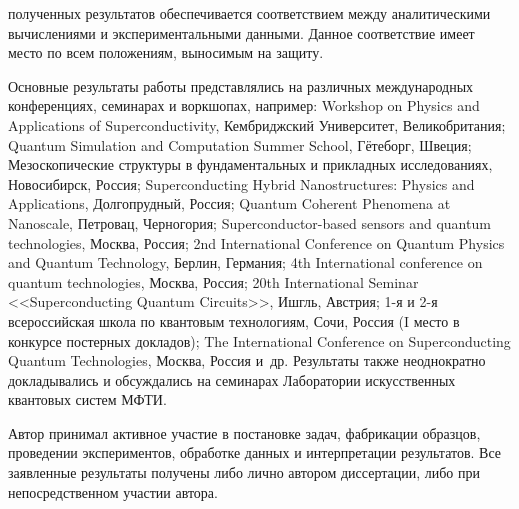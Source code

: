 {\reliability} полученных результатов обеспечивается соответствием между аналитическими вычислениями и экспериментальными данными. Данное соответствие имеет место по всем положениям, выносимым на защиту. 

{\probation}
Основные результаты работы представлялись на различных международных конференциях, семинарах и воркшопах, например: Workshop on Physics and Applications of Superconductivity, Кембриджский Университет, Великобритания; Quantum Simulation and Computation Summer School, Гётеборг, Швеция;  Мезоскопические структуры в  фундаментальных и прикладных исследованиях, Новосибирск, Россия; Superconducting Hybrid Nanostructures: Physics and Applications, Долгопрудный, Россия; Quantum Coherent Phenomena at Nanoscale, Петровац, Черногория; Superconductor-based sensors and quantum technologies, Москва, Россия; 2nd International Conference on Quantum Physics and Quantum Technology, Берлин, Германия; 4th International conference on quantum technologies, Москва, Россия; 20th International Seminar <<Superconducting Quantum Circuits>>, Ишгль, Австрия; 1-я и 2-я всероссийская школа по квантовым технологиям, Сочи, Россия (I место в конкурсе постерных докладов); The International Conference on Superconducting Quantum Technologies, Москва, Россия и~др. Результаты также неоднократно докладывались и обсуждались на семинарах Лаборатории искусственных квантовых систем МФТИ.


{\contribution} Автор принимал активное участие в постановке задач, фабрикации образцов, проведении экспериментов, обработке данных и интерпретации результатов. Все заявленные результаты получены либо лично автором диссертации, либо при непосредственном участии автора.


